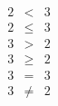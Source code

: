 \begin{eqnarray*}
	2 &  <  & 3 \\
	2 & \le & 3 \\
	3 &  >  & 2 \\
	3 & \ge & 2 \\
	3 &  =  & 3 \\
	3 & \ne & 2
\end{eqnarray*}

